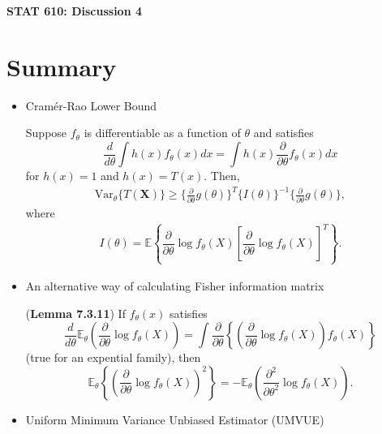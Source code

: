 \documentclass[12pt]{extarticle}
\newcommand{\E}{\mathbb E}
\begin{document}
\begin{center}
{\large \bf STAT 610: Discussion 4}
\end{center}
\vspace{0.22cm}

\section{Summary}
\begin{itemize}
	\item  Cram\'er-Rao Lower Bound

Suppose $f_\theta$ is differentiable as a function of $\theta$ and satisfies $$\dfrac{d}{d\theta}\int h(x)f_\theta(x)dx = \int h(x)\dfrac{\partial}{\partial \theta}f_\theta(x)dx$$
for $h(x) = 1$ and $h(x) = T(x)$. Then,
\begin{align*}
\text{Var}_\theta \{T(\mathbf{X}) \}\geq \{\frac{\partial}{\partial\theta}g(\theta)\}^T\{I(\theta)\}^{-1} \{\frac{\partial}{\partial\theta}g(\theta)\},
\end{align*}where
\begin{align*}
I(\theta) = \E\left\{\dfrac{\partial}{\partial \theta}\log f_\theta(X)\left[\dfrac{\partial}{\partial \theta}\log f_\theta(X)\right]^T\right\}.
\end{align*}

\item An alternative way of calculating Fisher information matrix

(\textbf{Lemma 7.3.11}) If $f_\theta(x)$ satisfies $$\dfrac{d}{d\theta}\E_\theta\left(\dfrac{\partial}{\partial \theta}\log f_\theta(X)\right) = \int \dfrac{\partial}{\partial \theta}\left\{\left(\dfrac{\partial}{\partial \theta}\log f_\theta(X)\right)f_\theta(X)  \right\}$$(true for an expential family), then $$\E_\theta\left\{\left(\dfrac{\partial}{\partial \theta}\log f_\theta(X) \right)^2 \right\} = -\E_\theta\left(\dfrac{\partial^2}{\partial \theta^2}\log f_\theta(X) \right).$$
\item Uniform Minimum Variance Unbiased Estimator (UMVUE)

	\begin{itemize}
	
	
	

\end{itemize}
\end{itemize}
\end{document}
